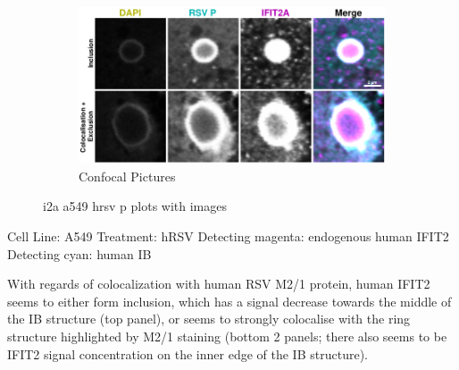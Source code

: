 \begin{figure}
    \begin{subfigure}{1\textwidth}
    \includegraphics[width=1\linewidth]{10. Chapter 5/Figs/01. Infection/01. IFIT2A/06. i2a a549 hrsv p.pdf} 
    \caption[]{Confocal Pictures}
    \end{subfigure}
    \caption[i2a a549 hrsv p plots with images]{i2a a549 hrsv p plots with images}
    \label{fig:i2a a549 hrsv p plots with images}
\end{figure}

Cell Line: A549 \newline
Treatment: hRSV \newline
Detecting magenta: endogenous human IFIT2  \newline
Detecting cyan: human IB \newline

With regards of colocalization with human RSV M2/1 protein, human IFIT2 seems to either form inclusion, which has a signal decrease towards the middle of the IB structure (top panel), or seems to strongly colocalise with the ring structure highlighted by M2/1 staining (bottom 2 panels; there also seems to be IFIT2 signal concentration on the inner edge of the IB structure).

